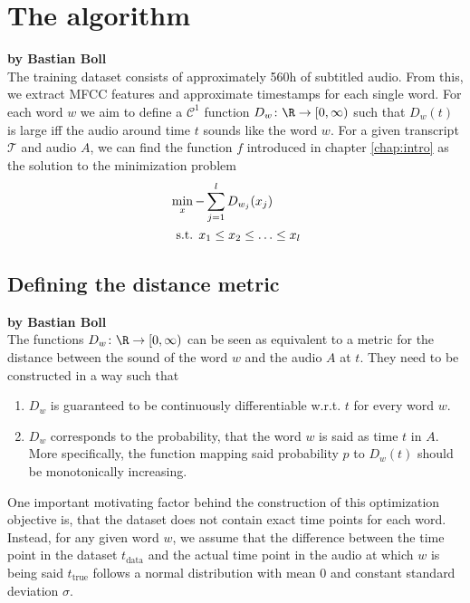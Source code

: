 \chapter{The algorithm}

\textbf{by Bastian Boll} \\

The training dataset consists of approximately 560h of subtitled audio. From this, we extract MFCC features and approximate timestamps for each single word. For each word $w$ we aim to define a $\mathcal{C}^1$ function \(D_w\colon \R \to \lbrack 0, \infty)\) such that $D_w(t)$ is large iff the audio around time $t$ sounds like the word $w$. For a given transcript $\mathcal{T}$ and audio $A$, we can find the function $f$ introduced in chapter \ref{chap:intro} as the solution to the minimization problem
\begin{align*}
	&\min_x -\sum_{j=1}^l D_{w_j}(x_j)\\
	&\hspace{0.5em}\text{s.t. }x_1\leq x_2\leq \dotsc\leq x_l
\end{align*}

\section{Defining the distance metric}

\textbf{by Bastian Boll} \\

The functions \(D_w\colon \R \to \lbrack 0, \infty)\) can be seen as equivalent to a metric for the distance between the sound of the word $w$ and the audio $A$ at $t$. They need to be constructed in a way such that
\begin{enumerate}
	\item $D_w$ is guaranteed to be continuously differentiable w.r.t. $t$ for every word $w$.
	\item $D_w$ corresponds to the probability, that the word $w$ is said as time $t$ in $A$. More specifically, the function mapping said probability $p$ to $D_w(t)$ should be monotonically increasing.
\end{enumerate}

One important motivating factor behind the construction of this optimization objective is, that the dataset does not contain exact time points for each word. Instead, for any given word $w$, we assume that the difference between the time point in the dataset $t_\text{data}$ and the actual time point in the audio at which $w$ is being said $t_\text{true}$ follows a normal distribution with mean $0$ and constant standard deviation $\sigma$.

